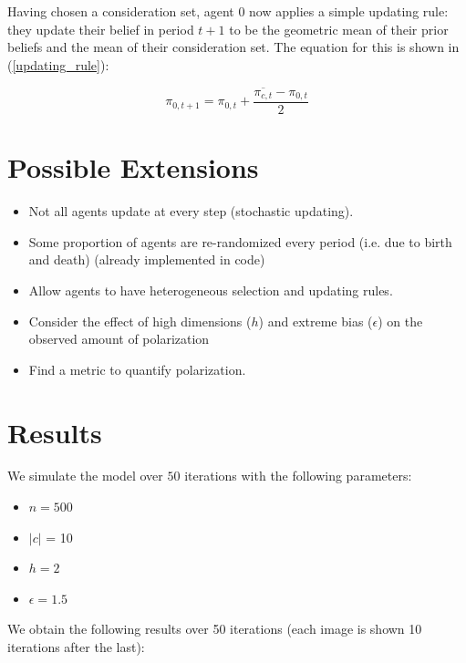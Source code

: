 \documentclass{article}
\begin{document}
Having chosen a consideration set, agent 0 now applies a simple updating rule: they update their belief in period $t+1$ to be the geometric mean of their prior beliefs and the mean of their consideration set. The equation for this is shown in (\ref{updating_rule}):

\begin{equation}
    \pi_{0, t+1} = \pi_{0, t} + \frac{\overline{\pi_{c, t}} - \pi_{0, t}}{2}
    \label{updating_rule}
\end{equation}

\section{Possible Extensions}

\begin{itemize}
    \item Not all agents update at every step (stochastic updating).
    \item Some proportion of agents are re-randomized every period (i.e. due to birth and death) (already implemented in code)
    \item Allow agents to have heterogeneous selection and updating rules.
    \item Consider the effect of high dimensions ($h$) and extreme bias ($\epsilon$) on the observed amount of polarization 
    \item Find a metric to quantify polarization.
\end{itemize}

\section{Results}
We simulate the model over $50$ iterations with the following parameters:

\begin{itemize}
    \item $n = 500$
    \item $|c|$ = 10
    \item $h = 2$
    \item $\epsilon = 1.5$ 
\end{itemize}

We obtain the following results over 50 iterations (each image is shown 10 iterations after the last):
\end{document}
